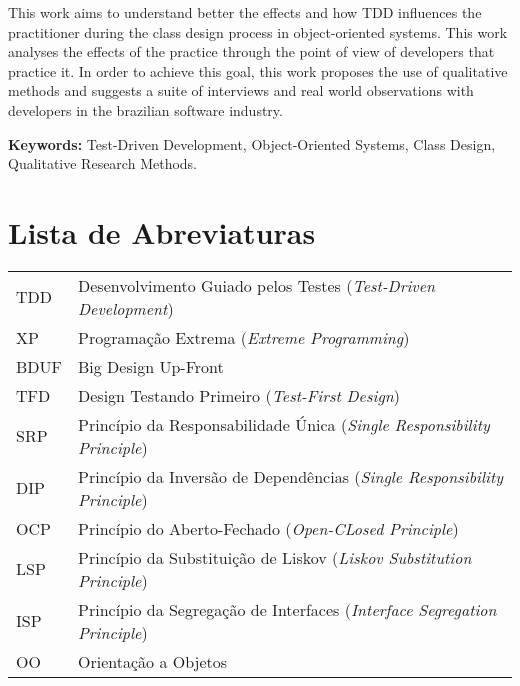 \documentclass[11pt,twoside,a4paper]{book}
\begin{document}
This work aims to understand better the effects and how TDD influences the
practitioner during the class design process in object-oriented systems. 
This work analyses the effects of the practice through the
point of view of developers that practice it. In order
to achieve this goal, this work proposes the use of qualitative methods and
suggests a suite of interviews and real world
observations with developers in the brazilian software industry.

\noindent \textbf{Keywords:} Test-Driven Development, Object-Oriented
Systems, Class Design, Qualitative Research Methods.

\tableofcontents    %

\chapter{Lista de Abreviaturas}
\begin{tabular}{ll}
         TDD         & Desenvolvimento Guiado pelos Testes (\emph{Test-Driven 
         Development})\\ 
         
         XP          & Programação Extrema (\emph{Extreme Programming})\\
		 
		 BDUF		 & Big Design Up-Front\\
		 
		 TFD         & Design Testando Primeiro (\emph{Test-First Design})\\
		 
		 SRP		 & Princípio da Responsabilidade Única (\emph{Single Responsibility
		 Principle})\\
		 
		 DIP		 & Princípio da Inversão de Dependências (\emph{Single Responsibility
		 Principle})\\ 
		 
		 OCP		 & Princípio do Aberto-Fechado (\emph{Open-CLosed Principle})\\
		 
		 LSP	 	 & Princípio da Substituição de Liskov (\emph{Liskov Substitution
		 Principle})\\
		 
		 ISP		 & Princípio da Segregação de Interfaces (\emph{Interface Segregation
		 Principle})\\
		 
		 OO		 	 & Orientação a Objetos
		 
\end{tabular}
\end{document}
